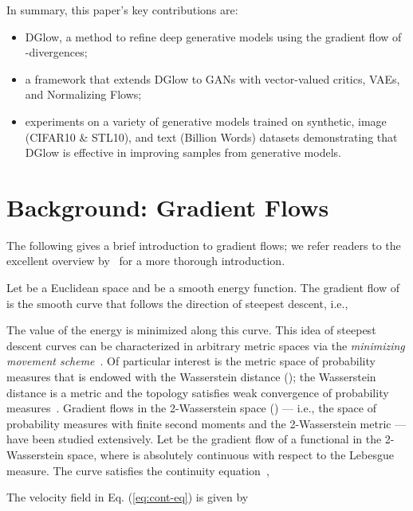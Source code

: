 \documentclass{article} \usepackage{iclr2021_conference,times}
\newcommand{\ourmethod}{\textsc{DG}low}
\begin{document}
In summary, this paper's key contributions are:

\begin{itemize}
	\item \ourmethod{}, a method to refine deep generative models using the gradient flow of -divergences;
\end{itemize}

\begin{itemize}
	\item a framework that extends \ourmethod{} to GANs with vector-valued critics, VAEs, and Normalizing Flows;
	\item experiments on a variety of generative models trained on synthetic, image (CIFAR10 \& STL10), and text (Billion Words) datasets demonstrating that \ourmethod{} is effective in improving samples from generative models. \end{itemize}



 \section{Background: Gradient Flows}
The following gives a brief introduction to gradient flows; we refer readers to the excellent overview by~\citet{santambrogio2017euclidean} for a more thorough introduction.


Let  be a Euclidean space and  be a smooth energy function. The gradient flow of  is the smooth curve  that follows the direction of steepest descent, i.e.,

 The value of the energy  is minimized along this curve. 
 This idea of steepest descent curves can be characterized in arbitrary metric spaces via the \emph{minimizing movement scheme}~\citep{jordan1998variational}. Of particular interest is the metric space of probability measures that is endowed with the Wasserstein distance (); the Wasserstein distance is a metric and the  topology satisfies weak convergence of probability measures~\citep[Theorem~6.9]{villani2008optimal}. Gradient flows in the 2-Wasserstein space () --- i.e., the space of probability measures with finite second moments and the 2-Wasserstein metric --- have been studied extensively. Let  be the gradient flow of a functional  in the 2-Wasserstein space, where  is absolutely continuous with respect to the Lebesgue measure. The curve  satisfies the continuity equation~\citep[Theorem~8.3.1]{ambrosio2008gradient}, 
 

The velocity field  in Eq. (\ref{eq:cont-eq}) is given by 
\end{document}
